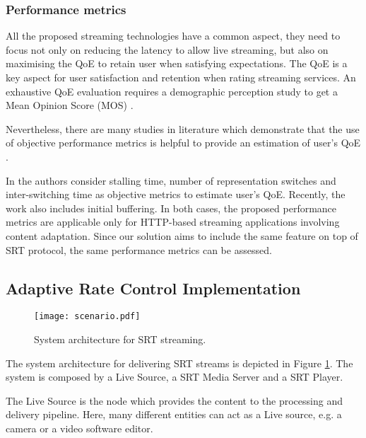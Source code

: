 \subsubsection{Performance metrics}
\label{sec:BMSB2020realtime}

All the proposed streaming technologies have a common aspect, they need to focus not only on reducing the latency to allow live streaming, but also on maximising the QoE to retain user when satisfying expectations. The QoE is a key aspect for user satisfaction and retention when rating streaming services. An exhaustive QoE evaluation requires a demographic perception study to get a Mean Opinion Score (MOS) \cite{Itu2016}.

Nevertheless, there are many studies in literature which demonstrate that the use of objective performance metrics is helpful to provide an estimation of user's QoE \cite{Alreshoodi2013}.

In \cite{claeys2014} the authors consider stalling time, number of representation switches and inter-switching time as objective metrics to estimate user's QoE. Recently, the work \cite{lentisco2017} also includes initial buffering.
In both cases, the proposed performance metrics are applicable only for HTTP-based streaming applications involving content adaptation. Since our solution aims to include the same feature on top of SRT protocol, the same performance metrics can be assessed.

\subsection{Adaptive Rate Control Implementation}
\label{sec:BMSB2020implementation}

\begin{figure}[htp]
	\centering
	\texttt{[image: scenario.pdf]}
	\caption{System architecture for SRT streaming.}
	\label{fig:BMSB2020system}
\end{figure}

The system architecture for delivering SRT streams is depicted in Figure \ref{fig:BMSB2020system}. The system is composed by a Live Source, a SRT Media Server and a SRT Player.

The Live Source is the node which provides the content to the processing and delivery pipeline. Here, many different entities can act as a Live source, e.g. a camera or a video software editor.

